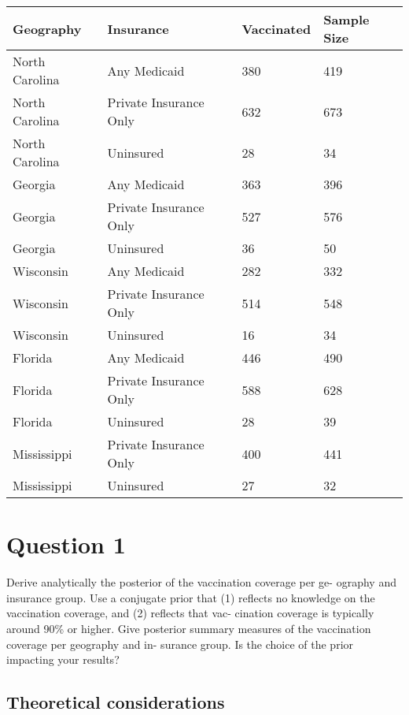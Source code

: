 \documentclass[
  letterpaper,
  DIV=11,
  numbers=noendperiod]{scrartcl}
\begin{document}
\begin{longtable}[]{@{}llll@{}}
\toprule\noalign{}
Geography & Insurance & Vaccinated & Sample Size \\
\midrule\noalign{}
\endhead
\bottomrule\noalign{}
\endlastfoot
North Carolina & Any Medicaid & 380 & 419 \\
North Carolina & Private Insurance Only & 632 & 673 \\
North Carolina & Uninsured & 28 & 34 \\
Georgia & Any Medicaid & 363 & 396 \\
Georgia & Private Insurance Only & 527 & 576 \\
Georgia & Uninsured & 36 & 50 \\
Wisconsin & Any Medicaid & 282 & 332 \\
Wisconsin & Private Insurance Only & 514 & 548 \\
Wisconsin & Uninsured & 16 & 34 \\
Florida & Any Medicaid & 446 & 490 \\
Florida & Private Insurance Only & 588 & 628 \\
Florida & Uninsured & 28 & 39 \\
Mississippi & Private Insurance Only & 400 & 441 \\
Mississippi & Uninsured & 27 & 32 \\
\end{longtable}

\section{Question 1}\label{question-1}

\begin{tcolorbox}[enhanced jigsaw, bottomrule=.15mm, colback=white, opacityback=0, left=2mm, colframe=quarto-callout-color-frame, toprule=.15mm, leftrule=.75mm, rightrule=.15mm, arc=.35mm, breakable]

Derive analytically the posterior of the vaccination coverage per ge-
ography and insurance group. Use a conjugate prior that (1) reflects no
knowledge on the vaccination coverage, and (2) reflects that vac-
cination coverage is typically around 90\% or higher. Give posterior
summary measures of the vaccination coverage per geography and in-
surance group. Is the choice of the prior impacting your results?

\end{tcolorbox}

\subsection{Theoretical
considerations}\label{theoretical-considerations}
\end{document}
